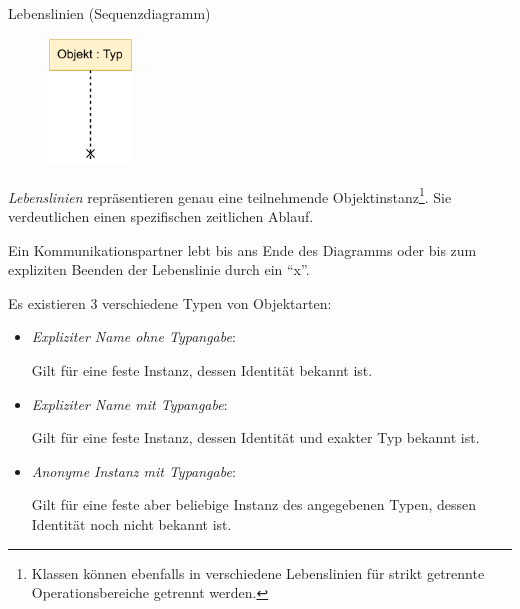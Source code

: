\begin{defi}{Lebenslinien (Sequenzdiagramm)}
    \begin{figure}
        \centering
        \includegraphics[width=0.2\textwidth]{includes/figures/defi_diagrams_sequenz_object.pdf}
    \end{figure}
    \emph{Lebenslinien} repräsentieren genau eine teilnehmende Objektinstanz\footnote{Klassen können ebenfalls in verschiedene Lebenslinien für strikt getrennte Operationsbereiche getrennt werden.}.
    Sie verdeutlichen einen spezifischen zeitlichen Ablauf.

    Ein Kommunikationspartner lebt bis ans Ende des Diagramms oder bis zum expliziten Beenden der Lebenslinie durch ein \enquote{x}.

    Es existieren 3 verschiedene Typen von Objektarten:
    \begin{itemize}
        \item \emph{Expliziter Name ohne Typangabe}:

              Gilt für eine feste Instanz, dessen Identität bekannt ist.
        \item \emph{Expliziter Name mit Typangabe}:

              Gilt für eine feste Instanz, dessen Identität und exakter Typ bekannt ist.
        \item \emph{Anonyme Instanz mit Typangabe}:

              Gilt für eine feste aber beliebige Instanz des angegebenen Typen, dessen Identität noch nicht bekannt ist.
    \end{itemize}
\end{defi}

